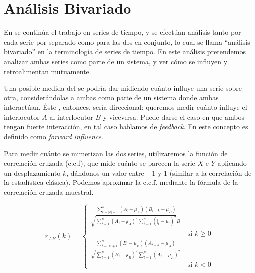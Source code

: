 \section{Análisis Bivariado}
\label{sec:analisis_bivariado}

\newcommand{\varnorm}[1] {
    (#1_t - \mu_{#1})
}

\newcommand{\squarederr}[1]{
    \sum\limits_{t=1}^n \varnorm{#1}^2
}

\newcommand{\crosscorr}[2]{
  \frac{\sum\limits_{t=|k|+1}^n \varnorm{#1} (#2_{t-k} - \mu_{#2})}{
    \sqrt{\squarederr{#1} \squarederr{#2}}
  } \\
}

\newcommand{\corrdenom}[2]{\sqrt{\squarederr{#1} \squarederr{#2}}}

En \cite{KOU2008.2} se continúa el trabajo en series de tiempo, y se efectúan análisis tanto por cada serie por separado como para las dos en conjunto, lo cual se llama ``análisis bivariado'' en la terminología de series de tiempo. En este análisis pretendemos analizar ambas series como parte de un sistema, y ver cómo se influyen y retroalimentan mutuamente.

Una posible medida del \entrainment se podría dar midiendo cuánto influye una serie sobre otra, considerándolas a ambas como parte de un sistema donde ambas interactúan. Éste \entrainment, entonces, sería direccional: queremos medir cuánto influye el interlocutor $A$ al interlocutor $B$ y viceversa. Puede darse el caso en que ambos tengan fuerte interacción, en tal caso hablamos de \emph{feedback}. En \cite{gravano2015backward} este concepto es definido como \emph{forward influence}.


Para medir cuánto se mimetizan las dos series, utilizaremos la función de correlación cruzada (c.c.f)\cite{CHATFIELD}, que mide cuánto se parecen la serie $X$ e $Y$ aplicando un desplazamiento $k$, dándonos un valor entre $-1$ y $1$ (similar a la correlación de la estadística clásica). Podemos aproximar la c.c.f. mediante la fórmula de la correlación cruzada muestral.

\begin{equation}
  \label{cross_correlation_definition}
  r_{AB}(k) =
  \left\{
    \begin{array}{ll}
      \frac{\sum\limits_{t=|k|+1}^n \varnorm{A} (B_{t-k} - \mu_{B})}{\corrdenom{A}[B]} \\ & \mbox{si } k \geq 0 \\
      \crosscorr{B}{A} & \mbox{si } k < 0
    \end{array}
  \right.
\end{equation}

